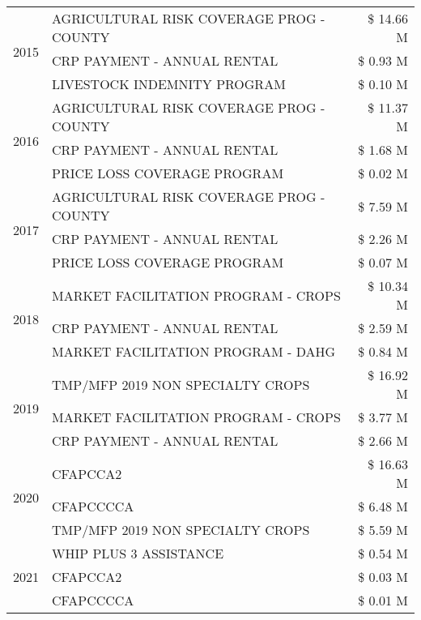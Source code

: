 \begin{tabular}{llr}
\multirow[t]{3}{*}{2015} & AGRICULTURAL RISK COVERAGE PROG - COUNTY & \$ 14.66 M \\
 & CRP PAYMENT - ANNUAL RENTAL & \$ 0.93 M \\
 & LIVESTOCK INDEMNITY PROGRAM & \$ 0.10 M \\
\cline{1-3}
\multirow[t]{3}{*}{2016} & AGRICULTURAL RISK COVERAGE PROG - COUNTY & \$ 11.37 M \\
 & CRP PAYMENT - ANNUAL RENTAL & \$ 1.68 M \\
 & PRICE LOSS COVERAGE PROGRAM & \$ 0.02 M \\
\cline{1-3}
\multirow[t]{3}{*}{2017} & AGRICULTURAL RISK COVERAGE PROG - COUNTY & \$ 7.59 M \\
 & CRP PAYMENT - ANNUAL RENTAL & \$ 2.26 M \\
 & PRICE LOSS COVERAGE PROGRAM & \$ 0.07 M \\
\cline{1-3}
\multirow[t]{3}{*}{2018} & MARKET FACILITATION PROGRAM - CROPS & \$ 10.34 M \\
 & CRP PAYMENT - ANNUAL RENTAL & \$ 2.59 M \\
 & MARKET FACILITATION PROGRAM - DAHG & \$ 0.84 M \\
\cline{1-3}
\multirow[t]{3}{*}{2019} & TMP/MFP 2019 NON SPECIALTY CROPS & \$ 16.92 M \\
 & MARKET FACILITATION PROGRAM - CROPS & \$ 3.77 M \\
 & CRP PAYMENT - ANNUAL RENTAL & \$ 2.66 M \\
\cline{1-3}
\multirow[t]{3}{*}{2020} & CFAPCCA2 & \$ 16.63 M \\
 & CFAPCCCCA & \$ 6.48 M \\
 & TMP/MFP 2019 NON SPECIALTY CROPS & \$ 5.59 M \\
\cline{1-3}
\multirow[t]{3}{*}{2021} & WHIP PLUS 3 ASSISTANCE & \$ 0.54 M \\
 & CFAPCCA2 & \$ 0.03 M \\
 & CFAPCCCCA & \$ 0.01 M \\
\cline{1-3}
\bottomrule
\end{tabular}
